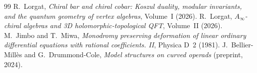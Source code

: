 \documentclass[11pt]{amsart}
\theoremstyle{definition}
\theoremstyle{remark}
\begin{document}
\begin{thebibliography}{99}
 R.~Lorgat,
\emph{Chiral bar and chiral cobar: Koszul duality, modular invariants,
and the quantum geometry of vertex algebras}, Volume~I (2026).
 R.~Lorgat,
\emph{$A_\infty$-chiral algebras and 3D holomorphic-topological QFT},
Volume~II (2026).
 M.~Jimbo and T.~Miwa,
\emph{Monodromy preserving deformation of linear ordinary
differential equations with rational coefficients. II},
Physica D~2 (1981).
 J.~Bellier-Mill\`es and G.~Drummond-Cole,
\emph{Model structures on curved operads} (preprint, 2024).
\end{thebibliography}
\end{document}
